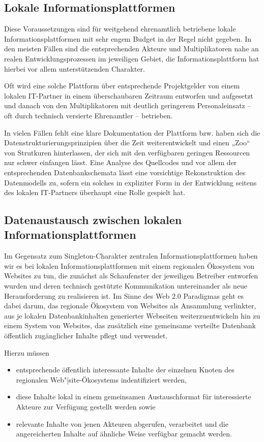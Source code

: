 \documentclass[a4paper,11pt]{article}
\begin{document}
\subsection{Lokale Informationsplattformen} 

Diese Voraussetzungen sind für weitgehend ehrenamtlich betriebene lokale
Informationsplattformen mit sehr engem Budget in der Regel nicht gegeben. In
den meisten Fällen sind die entsprechenden Akteure und Multiplikatoren nahe an
realen Entwicklungsprozessen im jeweiligen Gebiet, die Informationsplattform
hat hierbei vor allem unterstützenden Charakter.

Oft wird eine solche Plattform über entsprechende Projektgelder von einem
lokalen IT-Partner in einem überschaubaren Zeitraum entworfen und aufgesetzt
und danach von den Multiplikatoren mit deutlich geringerem Personaleinsatz --
oft durch technisch versierte Ehrenamtler -- betrieben.

In vielen Fällen fehlt eine klare Dokumentation der Plattform bzw. haben sich
die Datenstrukturierungsprinzipien über die Zeit weiterentwickelt und einen
„Zoo“ von Strutkuren hinterlassen, der sich mit den verfügbaren geringen
Ressourcen nur schwer einfangen lässt.  Eine Analyse des Quellcodes und vor
allem der entsprechenden Datenbankschemata lässt eine vorsichtige
Rekonstruktion des Datenmodells zu, sofern ein solches in expliziter Form in
der Entwicklung seitens des lokalen IT-Partners überhaupt eine Rolle gespielt
hat.

\subsection{Datenaustausch zwischen lokalen Informationsplattformen} 

Im Gegensatz zum Singleton-Charakter zentralen Informationsplattformen haben
wir es bei lokalen Informationsplattformen mit einem regionalen Ökosystem von
Websites zu tun, die zunächst als Schaufenster der jeweiligen Betreiber
entworfen wurden und deren technisch gestützte Kommunikation untereinander als
neue Herausforderung zu realisieren ist.  Im Sinne des Web 2.0 Paradigmas geht
es dabei darum, das regionale Ökosystem von Websites als Ansammlung verlinkter,
aus je lokalen Datenbankinhalten generierter Webseiten weiterzuentwickeln hin
zu einem System von Websites, das zusätzlich eine gemeinsame verteilte
Datenbank öffentlich zugänglicher Inhalte pflegt und verwendet. 

Hierzu müssen
\begin{itemize}
\item entsprechende öffentlich interessante Inhalte der einzelnen Knoten des
  regionalen Web"|site-Ökosystems indentifiziert werden,
\item diese Inhalte lokal in einem gemeinsamen Austauschformat für
  interessierte Akteure zur Verfügung gestellt werden sowie
\item relevante Inhalte von jenen Akteuren abgerufen, verarbeitet und die
  angereicherten Inhalte auf ähnliche Weise verfügbar gemacht werden.  
\end{itemize}
\end{document}
